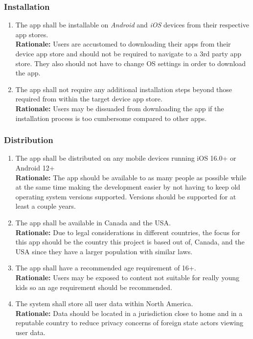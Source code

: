 \documentclass{article}
\begin{document}
\subsubsection{Installation}
\label{ssub:installation}


\begin{enumerate}[align=left, label=\textbf{DI-I\arabic*.}]
    \item The app shall be installable on \emph{Android} and \emph{iOS} devices from their respective app stores.\\
          {\bf Rationale:} Users are accustomed to downloading their apps from their device app store and should not be required to navigate to a 3rd party app store. They also should not have to change OS settings in order to download the app.
    \item The app shall not require any additional installation steps beyond those required from within the target device app store.\\
          {\bf Rationale:} Users may be dissuaded from downloading the app if the installation process is too cumbersome compared to other apps.
\end{enumerate}

\subsubsection{Distribution}
\label{ssub:distribution}


\begin{enumerate}[align=left, label=\textbf{DI-D\arabic*.}]
    \item The app shall be distributed on any mobile devices running iOS 16.0+ or Android 12+\\
          {\bf Rationale:} The app should be available to as many people as possible while at the same time making the development easier by not having to keep old operating system versions supported. Versions should be supported for at least a couple years.
    \item The app shall be available in Canada and the USA.\\
          {\bf Rationale:} Due to legal considerations in different countries, the focus for this app should be the country this project is based out of, Canada, and the USA since they have a larger population with similar laws.
    \item The app shall have a recommended age requirement of 16+.\\
          {\bf Rationale:} Users may be exposed to content not suitable for really young kids so an age requirement should be recommended.
    \item The system shall store all user data within North America.\\
          {\bf Rationale:} Data should be located in a jurisdiction close to home and in a reputable country to reduce privacy concerns of foreign state actors viewing user data.
\end{enumerate}
\end{document}

